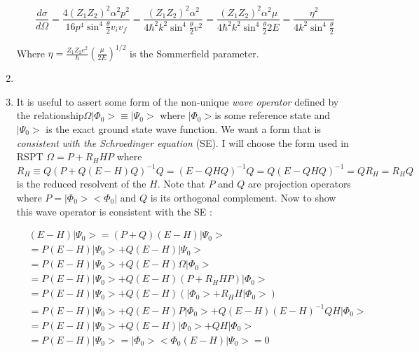 \documentclass[fleqn, 12pt]{article}
\begin{document}
\begin{enumerate}
\[
\frac{d\sigma}{d\Omega}=\frac{4\left(Z_{1}Z_{2}\right)^{2}\alpha^{2}p^{2}}{16p^{4}\sin^{4}\frac{\theta}{2}v_{i}v_{f}}=\frac{\left(Z_{1}Z_{2}\right)^{2}\alpha^{2}}{4\hbar^{2}k^{2}\sin^{4}\frac{\theta}{2}v^{2}}=\frac{\left(Z_{1}Z_{2}\right)^{2}\alpha^{2}\mu}{4\hbar^{2}k^{2}\sin^{4}\frac{\theta}{2}2E}=\frac{\eta^{2}}{4k^{2}\sin^{4}\frac{\theta}{2}}
\]


Where $\eta=\frac{Z_{1}Z_{2}e^{2}}{\hbar}\left(\frac{\mu}{2E}\right)^{1/2}$
is the Sommerfield parameter.

\item %

\item It is useful to assert some form of the non-unique \emph{wave operator}
defined by the relationship$\Omega|\Phi_{0}>\equiv|\Psi_{0}>$ where
$|\Phi_{0}>$is some reference state and $|\Psi_{0}>$ is the exact
ground state wave function. We want a form that is \emph{consistent}
\emph{with the Schroedinger equation} (SE). I will choose the form
used in RSPT $\Omega=P+R_{H}HP$ where $R_{H}\equiv Q\left(P+Q\left(E-H\right)Q\right)^{-1}Q=\left(E-QHQ\right)^{-1}Q=Q\left(E-QHQ\right)^{-1}=QR_{H}=R_{H}Q$
is the reduced resolvent of the $H$. Note that $P$ and $Q$ are
projection operators where $P=|\Phi_{0}><\Phi_{0}|$ and $Q$ is its
orthogonal complement. Now to show this wave operator is consistent
with the SE :

\begin{flushleft}
\begin{eqnarray*}
 & \left(E-H\right)|\Psi_{0}>=(P+Q)\left(E-H\right)|\Psi_{0}>\\
 & =P\left(E-H\right)|\Psi_{0}>+Q\left(E-H\right)|\Psi_{0}>\\
 & =P\left(E-H\right)|\Psi_{0}>+Q\left(E-H\right)\Omega|\Phi_{0}>\\
 & =P\left(E-H\right)|\Psi_{0}>+Q\left(E-H\right)\left(P+R_{H}HP\right)|\Phi_{0}>\\
 & =P\left(E-H\right)|\Psi_{0}>+Q\left(E-H\right)\left(|\Phi_{0}>+R_{H}H|\Phi_{0}>\right)\\
 & =P\left(E-H\right)|\Psi_{0}>+Q\left(E-H\right)P|\Phi_{0}>+Q\left(E-H\right)\left(E-H\right)^{-1}QH|\Phi_{0}>\\
 & =P\left(E-H\right)|\Psi_{0}>+Q\left(E-H\right)|\Phi_{0}>+QH|\Phi_{0}>\\
 & =P\left(E-H\right)|\Psi_{0}>=|\Phi_{0}><\Phi_{0}\left(E-H\right)|\Psi_{0}>=0
\end{eqnarray*}

\par\end{flushleft}


\end{enumerate}
\end{document}
